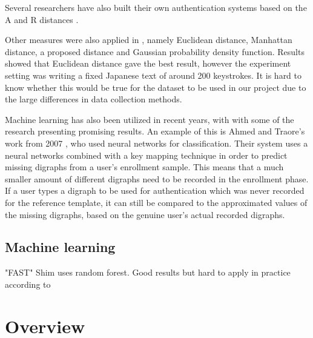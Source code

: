 \documentclass[informationsecurity]{gucmasterproject}
\begin{document}
Several researchers have also built their own authentication systems based on the A and R distances \cite{Kolakowska2011, Messerman, meaningless, prettyBadPaper, Davoudi1, Davoudi2, superResults}.

Other measures were also applied in \cite{Kaneko}, namely Euclidean distance, Manhattan distance, a proposed distance and Gaussian probability density function. Results showed that Euclidean distance gave the best result, however the experiment setting was writing a fixed Japanese text of around 200 keystrokes.
It is hard to know whether this would be true for the dataset to be used in our project due to the large differences in data collection methods.

Machine learning has also been utilized in recent years, with with some of the research presenting promising results.
An example of this is Ahmed and Traore's work from 2007 \cite{Ahmed}, who used neural networks for classification.
Their system uses a neural networks combined with a key mapping technique in order to predict missing digraphs from a user's enrollment sample.
This means that a much smaller amount of different digraphs need to be recorded in the enrollment phase.
If a user types a digraph to be used for authentication which was never recorded for the reference template, it can still be compared to the approximated values of the missing digraphs, based on the genuine user's actual recorded digraphs.


\subsection{Machine learning}
"FAST" Shim uses random forest. Good results but hard to apply in practice according to \cite{KANG201572}

\section{Overview}
\end{document}
